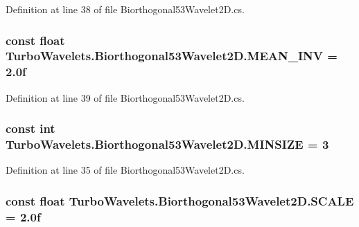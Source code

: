 \-Definition at line 38 of file \-Biorthogonal53\-Wavelet2\-D.\-cs.

\hypertarget{class_turbo_wavelets_1_1_biorthogonal53_wavelet2_d_a087508fa3e1f6e94477310a061d09784}{
\subsubsection[{\-M\-E\-A\-N\-\_\-\-I\-N\-V}]{\setlength{\rightskip}{0pt plus 5cm}const float {\bf \-Turbo\-Wavelets.\-Biorthogonal53\-Wavelet2\-D.\-M\-E\-A\-N\-\_\-\-I\-N\-V} = 2.\-0f}}\label{class_turbo_wavelets_1_1_biorthogonal53_wavelet2_d_a087508fa3e1f6e94477310a061d09784}


\-Definition at line 39 of file \-Biorthogonal53\-Wavelet2\-D.\-cs.

\hypertarget{class_turbo_wavelets_1_1_biorthogonal53_wavelet2_d_aa6981c16a1765d4664747274676d5eba}{
\subsubsection[{\-M\-I\-N\-S\-I\-Z\-E}]{\setlength{\rightskip}{0pt plus 5cm}const int {\bf \-Turbo\-Wavelets.\-Biorthogonal53\-Wavelet2\-D.\-M\-I\-N\-S\-I\-Z\-E} = 3}}\label{class_turbo_wavelets_1_1_biorthogonal53_wavelet2_d_aa6981c16a1765d4664747274676d5eba}


\-Definition at line 35 of file \-Biorthogonal53\-Wavelet2\-D.\-cs.

\hypertarget{class_turbo_wavelets_1_1_biorthogonal53_wavelet2_d_af0ccd844200200f57839dea6823daaa6}{
\subsubsection[{\-S\-C\-A\-L\-E}]{\setlength{\rightskip}{0pt plus 5cm}const float {\bf \-Turbo\-Wavelets.\-Biorthogonal53\-Wavelet2\-D.\-S\-C\-A\-L\-E} = 2.\-0f}}\label{class_turbo_wavelets_1_1_biorthogonal53_wavelet2_d_af0ccd844200200f57839dea6823daaa6}


